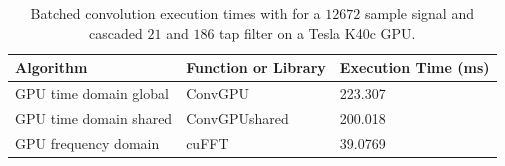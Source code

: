 \begin{table}
\caption{Batched convolution execution times with for a $12672$ sample signal and cascaded $21$ and $186$ tap filter on a Tesla K40c GPU.}
\begin{center}
\begin{tabular}{lll}
	\toprule
	Algorithm 				& Function or Library		& Execution Time (ms) \\ \midrule
	GPU time domain global 	& ConvGPU 					& 223.307		\\
	GPU time domain shared 	& ConvGPUshared 			& 200.018		\\
	GPU frequency domain 	& cuFFT						& 39.0769		\\ 
	\bottomrule
\end{tabular}
\end{center}
\label{tab:Batched_CPUvsGPUtable_12672_21_186}
\end{table}

